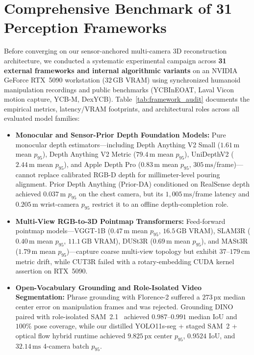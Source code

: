 \documentclass[10pt,journal]{IEEEtran}
\begin{document}
\appendices

\section{Comprehensive Benchmark of 31 Perception Frameworks}
\label{app:landscape}

Before converging on our sensor-anchored multi-camera 3D reconstruction architecture, we conducted a systematic experimental campaign across \textbf{31 external frameworks and internal algorithmic variants} on an NVIDIA GeForce RTX~5090 workstation ($32\,\mathrm{GB}$ VRAM) using synchronized humanoid manipulation recordings and public benchmarks (YCBInEOAT, Laval Vicon motion capture, YCB-M, DexYCB). Table~\ref{tab:framework_audit} documents the empirical metrics, latency/VRAM footprints, and architectural roles across all evaluated model families:
\begin{itemize}
    \item \textbf{Monocular and Sensor-Prior Depth Foundation Models:} Pure monocular depth estimators---including Depth Anything V2 Small ($1.61\,\mathrm{m}$ mean $p_{95}$), Depth Anything V2 Metric ($79.4\,\mathrm{m}$ mean $p_{95}$), UniDepthV2 ($2.44\,\mathrm{m}$ mean $p_{95}$), and Apple Depth Pro ($0.83\,\mathrm{m}$ mean $p_{95}$, $305\,\mathrm{ms}$/frame)---cannot replace calibrated RGB-D depth for millimeter-level pouring alignment. Prior Depth Anything (Prior-DA) conditioned on RealSense depth achieved $0.037\,\mathrm{m}$ $p_{95}$ on the chest camera, but its $1{,}005\,\mathrm{ms}$/frame latency and $0.205\,\mathrm{m}$ wrist-camera $p_{95}$ restrict it to an offline depth-completion role.
    \item \textbf{Multi-View RGB-to-3D Pointmap Transformers:} Feed-forward pointmap models---VGGT-1B ($0.47\,\mathrm{m}$ mean $p_{95}$, $16.5\,\mathrm{GB}$ VRAM), SLAM3R ($0.40\,\mathrm{m}$ mean $p_{95}$, $11.1\,\mathrm{GB}$ VRAM), DUSt3R ($0.69\,\mathrm{m}$ mean $p_{95}$), and MASt3R ($1.79\,\mathrm{m}$ mean $p_{95}$)---capture coarse multi-view topology but exhibit $37$--$179\,\mathrm{cm}$ metric drift, while CUT3R failed with a rotary-embedding CUDA kernel assertion on RTX~5090.
    \item \textbf{Open-Vocabulary Grounding and Role-Isolated Video Segmentation:} Phrase grounding with Florence-2 suffered a $273\,\mathrm{px}$ median center error on manipulation frames and was rejected. Grounding DINO paired with role-isolated SAM~2.1~\cite{ravi2024sam2} achieved $0.987$--$0.991$ median IoU and $100\%$ pose coverage, while our distilled YOLO11s-seg + staged SAM~2 + optical flow hybrid runtime achieved $9.825\,\mathrm{px}$ center $p_{95}$, $0.9524$ IoU, and $32.14\,\mathrm{ms}$ 4-camera batch $p_{95}$.
\end{itemize}
\end{document}
